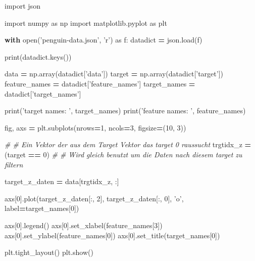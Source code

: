 \documentclass[]{book}
\newenvironment{Shaded}{\begin{snugshade}}{\end{snugshade}}
\newcommand{\BuiltInTok}[1]{#1}
\newcommand{\CommentTok}[1]{\textcolor[rgb]{0.56,0.35,0.01}{\textit{#1}}}
\newcommand{\ControlFlowTok}[1]{\textcolor[rgb]{0.13,0.29,0.53}{\textbf{#1}}}
\newcommand{\DecValTok}[1]{\textcolor[rgb]{0.00,0.00,0.81}{#1}}
\newcommand{\ImportTok}[1]{#1}
\newcommand{\NormalTok}[1]{#1}
\newcommand{\OperatorTok}[1]{\textcolor[rgb]{0.81,0.36,0.00}{\textbf{#1}}}
\newcommand{\StringTok}[1]{\textcolor[rgb]{0.31,0.60,0.02}{#1}}
\theoremstyle{definition}
\theoremstyle{definition}
\theoremstyle{definition}
\theoremstyle{definition}
\theoremstyle{remark}
\begin{document}
\begin{Shaded}
\begin{Highlighting}[]
\ImportTok{import}\NormalTok{ json}

\ImportTok{import}\NormalTok{ numpy }\ImportTok{as}\NormalTok{ np}
\ImportTok{import}\NormalTok{ matplotlib.pyplot }\ImportTok{as}\NormalTok{ plt}

\ControlFlowTok{with} \BuiltInTok{open}\NormalTok{(}\StringTok{'penguin-data.json'}\NormalTok{, }\StringTok{'r'}\NormalTok{) }\ImportTok{as}\NormalTok{ f:}
\NormalTok{    datadict }\OperatorTok{=}\NormalTok{ json.load(f)}

\BuiltInTok{print}\NormalTok{(datadict.keys())}

\NormalTok{data }\OperatorTok{=}\NormalTok{ np.array(datadict[}\StringTok{'data'}\NormalTok{])}
\NormalTok{target }\OperatorTok{=}\NormalTok{ np.array(datadict[}\StringTok{'target'}\NormalTok{])}
\NormalTok{feature_names }\OperatorTok{=}\NormalTok{ datadict[}\StringTok{'feature_names'}\NormalTok{]}
\NormalTok{target_names }\OperatorTok{=}\NormalTok{ datadict[}\StringTok{'target_names'}\NormalTok{]}

\BuiltInTok{print}\NormalTok{(}\StringTok{'target names: '}\NormalTok{, target_names)}
\BuiltInTok{print}\NormalTok{(}\StringTok{'feature names: '}\NormalTok{, feature_names)}

\NormalTok{fig, axs }\OperatorTok{=}\NormalTok{ plt.subplots(nrows}\OperatorTok{=}\DecValTok{1}\NormalTok{, ncols}\OperatorTok{=}\DecValTok{3}\NormalTok{, figsize}\OperatorTok{=}\NormalTok{(}\DecValTok{10}\NormalTok{, }\DecValTok{3}\NormalTok{))}

\CommentTok{# # Ein Vektor der aus dem Target Vektor das target 0 raussucht}
\NormalTok{trgtidx_z }\OperatorTok{=}\NormalTok{ (target }\OperatorTok{==} \DecValTok{0}\NormalTok{)}
\CommentTok{# # Wird gleich benutzt um die Daten nach diesem target zu filtern}

\NormalTok{target_z_daten }\OperatorTok{=}\NormalTok{ data[trgtidx_z, :]}

\NormalTok{axs[}\DecValTok{0}\NormalTok{].plot(target_z_daten[:, }\DecValTok{2}\NormalTok{], target_z_daten[:, }\DecValTok{0}\NormalTok{],}
            \StringTok{'o'}\NormalTok{, label}\OperatorTok{=}\NormalTok{target_names[}\DecValTok{0}\NormalTok{])}

\NormalTok{axs[}\DecValTok{0}\NormalTok{].legend()}
\NormalTok{axs[}\DecValTok{0}\NormalTok{].set_xlabel(feature_names[}\DecValTok{3}\NormalTok{])}
\NormalTok{axs[}\DecValTok{0}\NormalTok{].set_ylabel(feature_names[}\DecValTok{0}\NormalTok{])}
\NormalTok{axs[}\DecValTok{0}\NormalTok{].set_title(target_names[}\DecValTok{0}\NormalTok{])}

\NormalTok{plt.tight_layout()}
\NormalTok{plt.show()}
\end{Highlighting}
\end{Shaded}
\end{document}
